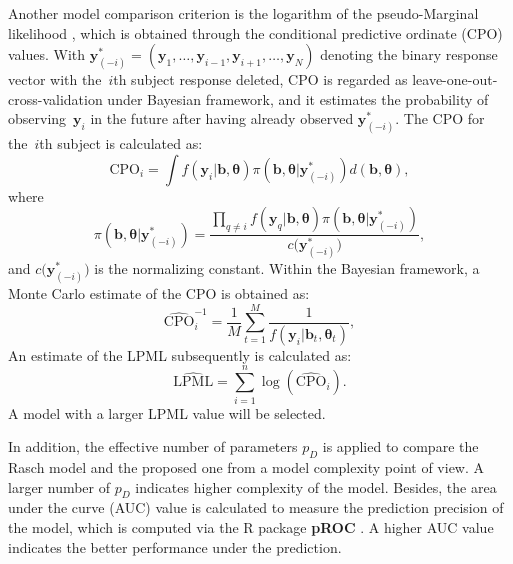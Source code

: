 \documentclass[12pt]{article}
\begin{document}
Another model comparison criterion is the logarithm of the pseudo-Marginal likelihood
\citep[LPML;][]{ibrahim2013bayesian}, which is obtained
through the conditional predictive ordinate (CPO) values.  With $\bm{y}^*_{(-i)} = (\bm{y}_1,\ldots, \bm{y}_{i-1}, \bm{y}_{i+1},\ldots, \bm{y}_N)$ denoting the binary response vector with the~$i$th subject response deleted, CPO is regarded as leave-one-out-cross-validation under Bayesian framework, and it estimates the probability of observing~$\bm{y}_i$ in the future after having already observed $\bm{y}^{*}_{(-i)}$.
The CPO for the~$i$th subject is calculated as:
\begin{equation}
\label{eq:CPO}
\text{CPO}_i = \int f(\bm{y}_i|\bm{b}, \bm{\theta}) \pi(\bm{b}, \bm{\theta}|\bm{y}^{*}_{(-i)}) d(\bm{b}, \bm{\theta}),
\end{equation} 
where 
\begin{equation*}
\pi(\bm{b}, \bm{\theta}|\bm{y}^{*}_{(-i)}) = \frac{\prod_{q \ne i}
	f(\bm{y}_q|\bm{b}, \bm{\theta} )\pi(\bm{b}, \bm{\theta}| \bm{y}^*_{(-i)})}{c\big(\bm{y}^*_{(-i)}\big)},
\end{equation*}
and $c\big(\bm{y}^*_{(-i)}\big)$ is the normalizing constant. Within the Bayesian framework, a Monte Carlo estimate of the CPO is obtained as:
\begin{equation}
\label{eq:CPOest}
\widehat{\text{CPO}}_i^{-1} = \frac{1}{M} \sum_{t=1}^{M}
\frac{1}{f(\bm{y}_i | \bm{b}_t, \bm{\theta}_t)},
\end{equation}
An estimate of
the LPML subsequently is calculated as:
\begin{equation}
\label{eq:LPML}
\widehat{\text{LPML}} = \sum_{i=1}^{n} \log(\widehat{\text{CPO}}_i).
\end{equation}
A model with a larger LPML value will be selected. 

In addition, the effective number of parameters $p_D$ is applied to compare the Rasch model and the proposed one from a model complexity point of view. A larger number of $p_D$ indicates higher complexity of the model. Besides, the area under the curve (AUC) value is calculated to measure the prediction precision of the model, which is computed via the \textsf{R} package \textbf{pROC} \citep{Rpkg:pROC}. A higher AUC value indicates the better performance under the prediction.
\end{document}
